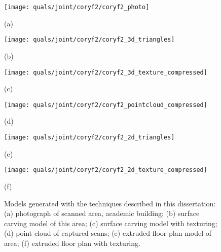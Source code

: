 \documentclass[12pt,onecolumn,oneside]{book}
\begin{document}
\begin{figure}

	\begin{minipage}[t]{0.30\linewidth}
		\centerline{\texttt{[image: quals/joint/coryf2/coryf2\_photo]}}
		\centerline{(a)}\medskip
	\end{minipage}
	\hfill
	\begin{minipage}[t]{0.30\linewidth}
		\centerline{\texttt{[image: quals/joint/coryf2/coryf2\_3d\_triangles]}}
		\centerline{(b)}\medskip
	\end{minipage}
	\hfill
	\begin{minipage}[t]{0.30\linewidth}
		\centerline{\texttt{[image: quals/joint/coryf2/coryf2\_3d\_texture\_compressed]}}
		\centerline{(c)}\medskip
	\end{minipage}
	
	\begin{minipage}[b]{0.30\linewidth}
		\centerline{\texttt{[image: quals/joint/coryf2/coryf2\_pointcloud\_compressed]}}
		\centerline{(d)}\medskip
	\end{minipage}
	\hfill
	\begin{minipage}[b]{0.30\linewidth}
		\centerline{\texttt{[image: quals/joint/coryf2/coryf2\_2d\_triangles]}}
		\centerline{(e)}\medskip
	\end{minipage}
	\hfill
	\begin{minipage}[b]{0.30\linewidth}
		\centerline{\texttt{[image: quals/joint/coryf2/coryf2\_2d\_texture\_compressed]}}
		\centerline{(f)}\medskip
	\end{minipage}
	
	\caption[Models generated with our techniques.]{Models generated with the techniques described in this dissertation:  (a) photograph of scanned area, academic building; (b) surface carving model of this area; (c) surface carving model with texturing; (d) point cloud of captured scans; (e) extruded floor plan model of area; (f) extruded floor plan with texturing.}
	\label{fig:coryf2}

\end{figure}
\end{document}
